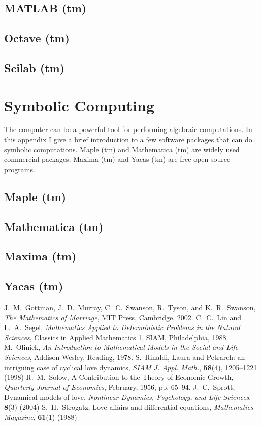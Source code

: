 \documentclass{book}
\begin{document}
\section{MATLAB (tm)}
\section{Octave (tm)}
\section{Scilab (tm)}
%
%
%
\chapter{Symbolic Computing}
The computer can be a powerful tool for performing
algebraic computations.  In this appendix I give a brief introduction
to a few software packages that can do symbolic computations.
Maple (tm) and Mathematica (tm) are widely used commercial
packages.  Maxima (tm) and Yacas (tm) are free open-source
programs.
\section{Maple (tm)}
\section{Mathematica (tm)}
\section{Maxima (tm)}
\section{Yacas (tm)}
%
\begin{thebibliography}{99}
J.~M.~Gottman, J.~D.~Murray, C.~C.~Swanson,
R.~Tyson, and K.~R.~Swanson,
\emph{The Mathematics of Marriage},
MIT Press, Cambridge, 2002.
C.~C.~Lin and L.~A.~Segel,
\emph{Mathematics Applied to Deterministic
Problems in the Natural Sciences},
Classics in Applied Mathematics 1,
SIAM, Philadelphia, 1988.
M.~Olinick,
\emph{An Introduction to Mathematical Models
in the Social and Life Sciences},
Addison-Wesley, Reading, 1978.
S.~Rinaldi, Laura and Petrarch: an intriguing case of
cyclical love dynamics,
\emph{SIAM J. Appl. Math.}, \textbf{58}(4), 1205--1221 (1998)
R.~M.~Solow, A Contribution to the Theory of Economic Growth,
\emph{Quarterly Journal of Economics}, February, 1956, pp. 65--94.
J.~C.~Sprott,
Dynamical models of love,
\emph{Nonlinear Dynamics, Psychology, and Life Sciences},
\textbf{8}(3) (2004)
S.~H.~Strogatz, Love affairs and differential equations,
\emph{Mathematics Magazine}, \textbf{61}(1) (1988)
\end{thebibliography}
\printindex
\end{document}

